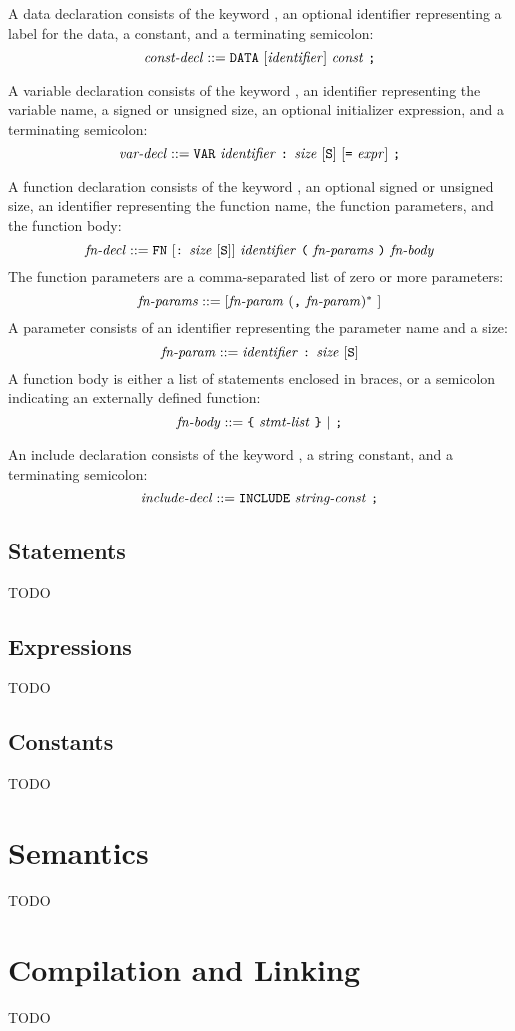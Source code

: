 \documentclass[10pt]{article}
\begin{document}
 A data declaration consists of the keyword
, an optional identifier representing a label for the data,
a constant, and a terminating semicolon:
%
$$\mbox{\textit{const-decl}} ::= \mbox{\texttt{DATA} $[\mbox{\textit{identifier}}]$
  \ensuremath{\mbox{\textit{const}}} \texttt{;}}$$

 A variable declaration consists of the
keyword , an identifier representing the variable name, a
signed or unsigned size, an optional initializer expression, and a
terminating semicolon:
%
$$\mbox{\textit{var-decl}} ::= \mbox{\texttt{VAR} \ensuremath{\mbox{\textit{identifier}}} \texttt{:}
  \ensuremath{\mbox{\textit{size}}} $[\texttt{S}]$ $[$\texttt{=} \ensuremath{\mbox{\textit{expr}}}$]$ \texttt{;}}$$

 A function declaration consists of the
keyword , an optional signed or unsigned size, an identifier
representing the function name, the function parameters, and the
function body:
%
$$\mbox{\textit{fn-decl}} ::= \mbox{\texttt{FN} \ensuremath{[}\texttt{:} \ensuremath{\mbox{\textit{size}}}
    \ensuremath{[}\texttt{S}\ensuremath{]}\ensuremath{]} \ensuremath{\mbox{\textit{identifier}}} \texttt{(} \ensuremath{\mbox{\textit{fn-params}}}
  \texttt{)} \ensuremath{\mbox{\textit{fn-body}}}}$$
%
The function parameters are a comma-separated list of zero or more
parameters:
%
$$\mbox{\textit{fn-params}} ::= \mbox{\ensuremath{[}\ensuremath{\mbox{\textit{fn-param}}} $($\texttt{,}
  \ensuremath{\mbox{\textit{fn-param}}}$)^*$ \ensuremath{]}}$$
%
A parameter consists of an identifier representing the parameter name
and a size:
%
$$\mbox{\textit{fn-param}} ::= \mbox{\ensuremath{\mbox{\textit{identifier}}} \texttt{:}
  \ensuremath{\mbox{\textit{size}}} \ensuremath{[}\texttt{S}\ensuremath{]}}$$
%
A function body is either a list of statements enclosed in braces, or
a semicolon indicating an externally defined function:
%
$$\mbox{\textit{fn-body}} ::= \mbox{\texttt{\{} \ensuremath{\mbox{\textit{stmt-list}}} \texttt{\}}
  $|$ \texttt{;}}$$

 An include declaration consists of the
keyword , a string constant, and a terminating semicolon:
%
$$\mbox{\textit{include-decl}} ::= \mbox{\texttt{INCLUDE}
  \ensuremath{\mbox{\textit{string-const}}} \texttt{;}}$$
%

\subsection{Statements}
\label{sec:syntax:statements}

TODO

\subsection{Expressions}
\label{sec:syntax:expressions}

TODO

\subsection{Constants}
\label{sec:syntax:constants}

TODO

\section{Semantics}
\label{sec:syntax:semantics}

TODO

\section{Compilation and Linking}
\label{sec:compilation}

TODO
\end{document}
